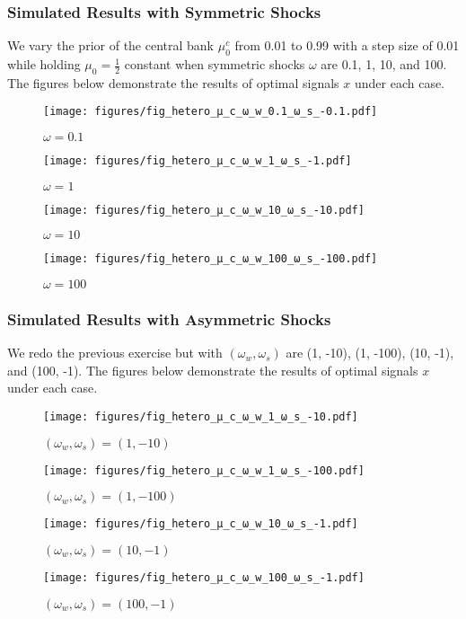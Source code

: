 \documentclass[12pt,a4paper]{article}
\begin{document}
\subsubsection{Simulated Results with Symmetric Shocks}
We vary the prior of the central bank $\mu_0^c$ from 0.01 to 0.99 with a step size of 0.01 while holding $\mu_0=\frac{1}{2}$ constant when symmetric shocks $\omega$ are 0.1, 1, 10, and 100. The figures below demonstrate the results of optimal signals $x$ under each case.
\begin{figure}[htp!]
\caption{$\omega=0.1$}
\centering
\texttt{[image: figures/fig\_hetero\_μ\_c\_ω\_w\_0.1\_ω\_s\_-0.1.pdf]}
\end{figure}
\begin{figure}[htp!]
\caption{$\omega=1$}
\centering
\texttt{[image: figures/fig\_hetero\_μ\_c\_ω\_w\_1\_ω\_s\_-1.pdf]}
\end{figure}
\begin{figure}[htp!]
\caption{$\omega=10$}
\centering
\texttt{[image: figures/fig\_hetero\_μ\_c\_ω\_w\_10\_ω\_s\_-10.pdf]}
\end{figure}
\begin{figure}[htp!]
\caption{$\omega=100$}
\centering
\texttt{[image: figures/fig\_hetero\_μ\_c\_ω\_w\_100\_ω\_s\_-100.pdf]}
\end{figure}

\subsubsection{Simulated Results with Asymmetric Shocks}
We redo the previous exercise but with $(\omega_w,\omega_s)$ are (1, -10), (1, -100), (10, -1), and (100, -1). The figures below demonstrate the results of optimal signals $x$ under each case.
\begin{figure}[htp!]
\caption{$(\omega_w,\omega_s)=(1, -10)$}
\centering
\texttt{[image: figures/fig\_hetero\_μ\_c\_ω\_w\_1\_ω\_s\_-10.pdf]}
\end{figure}
\begin{figure}[htp!]
\caption{$(\omega_w,\omega_s)=(1, -100)$}
\centering
\texttt{[image: figures/fig\_hetero\_μ\_c\_ω\_w\_1\_ω\_s\_-100.pdf]}
\end{figure}
\begin{figure}[htp!]
\caption{$(\omega_w,\omega_s)=(10, -1)$}
\centering
\texttt{[image: figures/fig\_hetero\_μ\_c\_ω\_w\_10\_ω\_s\_-1.pdf]}
\end{figure}
\begin{figure}[htp!]
\caption{$(\omega_w,\omega_s)=(100, -1)$}
\centering
\texttt{[image: figures/fig\_hetero\_μ\_c\_ω\_w\_100\_ω\_s\_-1.pdf]}
\end{figure}
\end{document}
